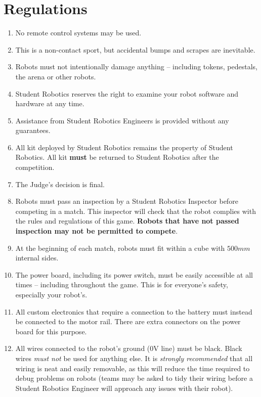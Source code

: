 \section {Regulations}
\label{sec:Regulations}

\begin{enumerate}


\item No remote control systems may be used.
\item This is a non-contact sport, but accidental bumps and scrapes are inevitable.
\item Robots must not intentionally damage anything -- including tokens, pedestals, the arena or other robots.
\item Student Robotics reserves the right to examine your robot software and hardware at any time.
\item Assistance from Student Robotics Engineers is provided without any guarantees.
\item All kit deployed by Student Robotics remains the property of Student Robotics.
      All kit \textbf{must} be returned to Student Robotics after the competition.

\item The Judge's decision is final.


\item Robots must pass an inspection by a Student Robotics Inspector before competing in a match.
      This inspector will check that the robot complies with the rules and regulations of this game.
      \textbf{Robots that have not passed inspection may not be permitted to compete}.

\item At the beginning of each match, robots must fit within a cube with $500mm$ internal sides.

\item The power board, including its power switch, must be easily accessible at all times -- including throughout the game.
      This is for everyone's safety, especially your robot's.

\item All custom electronics that require a connection to the battery must instead be connected to the motor rail.
      There are extra connectors on the power board for this purpose.

\item All wires connected to the robot's ground (0V line) must be black.
      Black wires \emph{must not} be used for anything else.
      It is \emph{strongly recommended} that all wiring is neat and easily removable, as this will reduce the time required to debug problems on robots
       (teams may be asked to tidy their wiring before a Student Robotics Engineer will approach any issues with their robot).


\end{enumerate}
